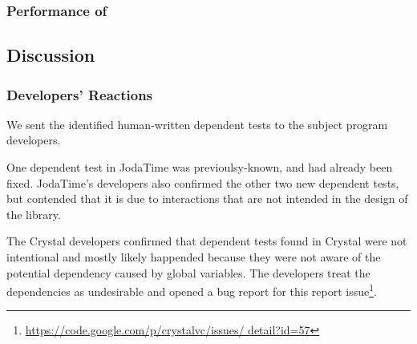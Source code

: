
\subsubsection{Performance of \ourtool}
\label{sec:performance}






 





\subsection{Discussion}

\subsubsection{Developers' Reactions}

We sent the identified human-written dependent tests to the
subject program developers.

One dependent test in JodaTime was previoulsy-known,
and had already been fixed. JodaTime's
developers also confirmed the other two new dependent
tests, but contended that it is due to interactions
that are not intended in the design of the library.

The Crystal developers confirmed that dependent tests
found in Crystal were not intentional and mostly likely
happended because they were not aware of the potential dependency
caused by global variables. The developers treat the
dependencies as undesirable and opened a bug report for
this report issue\footnote{\url{https://code.google.com/p/crystalvc/issues/ detail?id=57}}.

